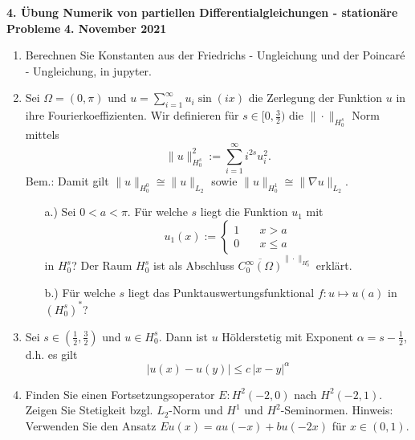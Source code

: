 \documentclass[11pt,a4paper]{report}
\begin{document}
\begin{center}
\textbf{4. \"Ubung Numerik von partiellen Differentialgleichungen - station\"are Probleme} \newline 
\textbf{4. November 2021}
\end{center}

\setcounter{enumi}{4}

\begin{enumerate}


\item Berechnen Sie Konstanten aus der Friedrichs - Ungleichung und
  der Poincar\'e  - Ungleichung, in jupyter.


\item Sei $\Omega = (0,\pi)$ und $u = \sum\limits_{i=1}^\infty u_i\sin(ix)$ die Zerlegung der Funktion $u$ in ihre Fourierkoeffizienten. Wir definieren f\"ur $s \in [0,\frac{3}{2})$ die $\| \cdot \|_{H_0^s}$ Norm mittels
$$\| u \|^2_{H_0^s}:= \sum\limits_{i=1}^\infty i^{2s} u_i^2 . $$
Bem.: Damit gilt $\| u \|_{H_0^0} \cong \| u \| _{L_2}$ sowie $\| u \|_{H_0^1} \cong \| \nabla u \|_{L_2} $.
\begin{itemize}
\item[a.)] Sei $0<a<\pi$. F\"ur welche $s$ liegt die Funktion $u_1$ mit $$u_1(x):=\left\{\begin{aligned} 1 & \quad x>a \\ 0 & \quad x\leq a \end{aligned}\right.$$ in $H_0^s$? Der Raum $H_0^s$ ist als Abschluss $\overline{C_0^\infty(\Omega)}^{\|\cdot\|_{H_0^s}}$ erkl\"art.
\item[b.)] F\"ur welche $s$ liegt das Punktauswertungsfunktional $f: u\mapsto u(a)$ in $(H_0^s)^*$?
\end{itemize}


\item Sei $s \in(\frac{1}{2}, \frac{3}{2})$ und $u \in H_0^s$. Dann ist $u$ H\"olderstetig mit Exponent $\alpha = s-\frac{1}{2}$, d.h. es gilt
$$|u(x)-u(y) | \leq c\,|x-y|^\alpha $$

\item Finden Sie einen Fortsetzungsoperator $E : H^2(-2,0)$ nach
  $H^2(-2,1)$. Zeigen Sie Stetigkeit bzgl. $L_2$-Norm und $H^1$ und
  $H^2$-Seminormen.  Hinweis: Verwenden Sie den Ansatz $Eu(x) = a
  u(-x) + b u(-2x)$ f\"ur $x \in (0,1)$. 


  
\end{enumerate}
\end{document}

